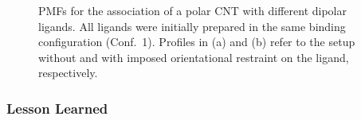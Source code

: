 \documentclass[9pt,lessons]{livecoms}
\begin{document}
\begin{figure}[htb!]
  \centering    
  \caption{
  PMFs for the association of a polar CNT with different dipolar ligands. 
  All ligands were initially prepared in the same binding configuration (Conf.~1).
  Profiles in (a) and (b) refer to the setup without and with imposed orientational restraint on the ligand, respectively.
  }
  \label{fig:polCNT_polLig}
\end{figure}

\subsubsection*{Lesson Learned}
\end{document}
